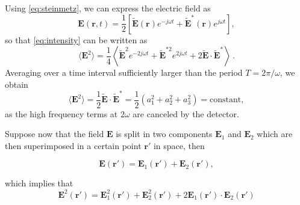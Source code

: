 Using \autoref{eq:steinmetz}, we can express the electric field as
\begin{equation}\label{eq:e-steinmetz}
\textbf{E}(\textbf{r}, t) = \frac{1}{2}\left[ \widetilde{\textbf{E}}(\textbf{r})e^{-j\omega t} + \widetilde{\textbf{E}}^*(\textbf{r})e^{j\omega t}\right],
\end{equation}
so that \autoref{eq:intensity} can be written as
\begin{equation}
	\langle\textbf{E}^2\rangle = \frac{1}{4} \left\langle\widetilde{\textbf{E}}^2 e^{-2j\omega t} + \widetilde{\textbf{E}}^{*2}e^{2j\omega t} + 2  \widetilde{\textbf{E}}\cdot\widetilde{\textbf{E}}^*\right\rangle \,.
\end{equation}
Averaging over a time interval sufficiently larger than the period $T=2\pi/ \omega$, we obtain
\begin{equation}
	\langle \textbf{E}^2 \rangle =\frac{1}{2}\widetilde{\textbf{E}}\cdot\widetilde{\textbf{E}}^* =\frac{1}{2}\left(a_1^2 + a_2^2 + a_3^2\right) = \text{constant},
\end{equation}
as the high frequency terms at $2\omega$ are canceled by the detector.

Suppose now that the field $\textbf{E}$ is split in two components $\textbf{E}_1$ and $\textbf{E}_2$ which are then superimposed in a certain point $\textbf{r}'$ in space, then

\begin{equation}
\textbf{E}(\textbf{r}') = \textbf{E}_1(\textbf{r}') + \textbf{E}_2(\textbf{r}'),
\end{equation}

which implies that
\begin{equation}
	\textbf{E}^2 (\textbf{r}')= \textbf{E}_1^2(\textbf{r}') + \textbf{E}_2^2(\textbf{r}') + 2\textbf{E}_1(\textbf{r}')\cdot\textbf{E}_2(\textbf{r}')
\end{equation}

